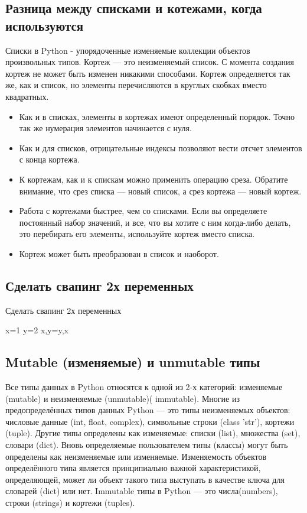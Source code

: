 \subsection{Разница между списками и котежами, когда используются}

	Списки в Python - упорядоченные изменяемые коллекции объектов произвольных типов.  
Кортеж — это неизменяемый список. С момента создания кортеж не может быть изменен никакими способами.  Кортеж определяется так же, как и список, но элементы перечисляются в круглых скобках вместо квадратных.
	\begin{itemize}
\item	Как и в списках, элементы в кортежах имеют определенный порядок. Точно так же нумерация элементов начинается с нуля. 
\item	Как и для списков, отрицательные индексы позволяют вести отсчет элементов с конца кортежа.
\item	К кортежам, как и к спискам можно применить операцию среза. Обратите внимание, что срез списка — новый список, а срез кортежа — новый кортеж.
\item	Работа с кортежами быстрее, чем со списками. Если вы определяете постоянный набор значений, и все, что вы хотите с ним когда-либо делать, это перебирать его элементы, используйте кортеж вместо списка.
\item	Кортеж может быть преобразован в список и наоборот.
	\end{itemize}
	
\subsection{Сделать свапинг 2х переменных}	

Сделать свапинг 2х переменных
	\begin{python}
		x=1
		y=2
		x,y=y,x
	\end{python}
	
\subsection{Mutable (изменяемые) и unmutable типы}

Все типы данных в Python относятся к одной из 2-х категорий: изменяемые (mutable) и неизменяемые (unmutable)( immutable). Многие из предопределённых типов данных Python — это типы неизменяемых объектов: числовые данные (int, float, complex), символьные строки (class 'str'), кортежи (tuple). Другие типы определены как изменяемые: списки (list), множества (set), словари (dict). Вновь определяемые пользователем типы (классы) могут быть определены как неизменяемые или изменяемые. Изменяемость объектов определённого типа является принципиально важной характеристикой, определяющей, может ли объект такого типа выступать в качестве ключа для словарей (dict) или нет.
Immutable типы в Python — это числа(numbers), строки (strings) и кортежи (tuples).	

